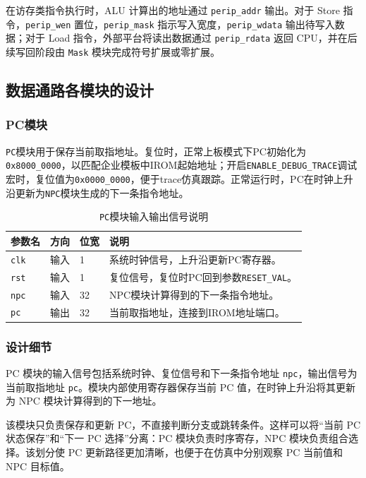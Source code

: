 \documentclass[UTF8,a4paper,12pt]{ctexart}
\newcommand{\code}[1]{\texttt{#1}}
\begin{document}
在访存类指令执行时，ALU 计算出的地址通过 \code{perip\_addr} 输出。对于 Store 指令，\code{perip\_wen} 置位，\code{perip\_mask} 指示写入宽度，\code{perip\_wdata} 输出待写入数据；对于 Load 指令，外部平台将读出数据通过 \code{perip\_rdata} 返回 CPU，并在后续写回阶段由 \code{Mask} 模块完成符号扩展或零扩展。

\subsection{数据通路各模块的设计}

\subsubsection{PC模块}

\code{PC}模块用于保存当前取指地址。复位时，正常上板模式下PC初始化为\code{0x8000\_0000}，以匹配企业模板中IROM起始地址；开启\code{ENABLE\_DEBUG\_TRACE}调试宏时，复位值为\code{0x0000\_0000}，便于trace仿真跟踪。正常运行时，PC在时钟上升沿更新为\code{NPC}模块生成的下一条指令地址。

\begin{table}[H]
\centering
\caption{\code{PC}模块输入输出信号说明}
\footnotesize
\renewcommand{\arraystretch}{1.15}
\begin{tabularx}{\textwidth}{p{3.2cm}p{1.5cm}p{2.1cm}X}
\toprule
参数名 & 方向 & 位宽 & 说明 \\
\midrule
\code{clk} & 输入 & 1 & 系统时钟信号，上升沿更新PC寄存器。 \\
\code{rst} & 输入 & 1 & 复位信号，复位时PC回到参数\code{RESET\_VAL}。 \\
\code{npc} & 输入 & 32 & NPC模块计算得到的下一条指令地址。 \\
\code{pc} & 输出 & 32 & 当前取指地址，连接到IROM地址端口。 \\
\bottomrule
\end{tabularx}
\end{table}

\subsubsection*{设计细节}

PC 模块的输入信号包括系统时钟、复位信号和下一条指令地址 \code{npc}，输出信号为当前取指地址 \code{pc}。模块内部使用寄存器保存当前 PC 值，在时钟上升沿将其更新为 NPC 模块计算得到的下一地址。

该模块只负责保存和更新 PC，不直接判断分支或跳转条件。这样可以将“当前 PC 状态保存”和“下一 PC 选择”分离：PC 模块负责时序寄存，NPC 模块负责组合选择。该划分使 PC 更新路径更加清晰，也便于在仿真中分别观察 PC 当前值和 NPC 目标值。
\end{document}
